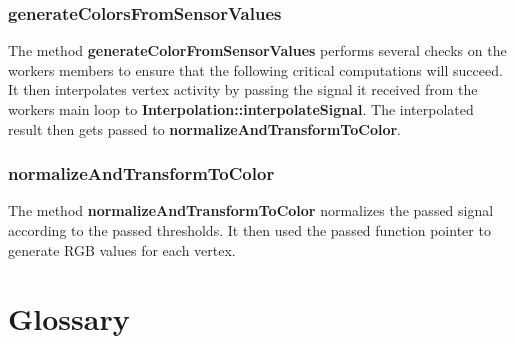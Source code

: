 \subsubsection{generateColorsFromSensorValues}

The method \textbf{generateColorFromSensorValues} performs several checks on the workers members to ensure that the following critical computations will succeed. It then interpolates vertex activity by passing the signal it received from the workers main loop to \textbf{Interpolation::interpolateSignal}. The interpolated result then gets passed to \textbf{normalizeAndTransformToColor}.

\subsubsection{normalizeAndTransformToColor}

The method \textbf{normalizeAndTransformToColor} normalizes the passed signal according to the passed thresholds. It then used the passed function pointer to generate RGB values for each vertex.

\clearpage

\section{Glossary}

